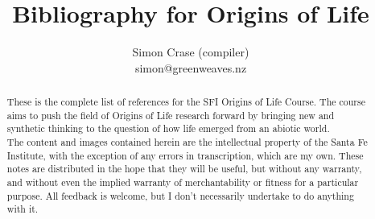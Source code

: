 \documentclass[]{article}
\title{
	Bibliography for Origins of Life
}
\author{Simon Crase (compiler)\\simon@greenweaves.nz}
\begin{document}
\maketitle

\begin{abstract}
	These is the complete list of references for the SFI Origins of Life Course. The course aims to push the field of Origins of Life research forward by bringing new and synthetic thinking to the question of how life emerged from an abiotic world.\\
	The content and images contained herein are the intellectual property of the Santa Fe Institute, with the exception of any errors in transcription, which are my own.
	These notes are distributed in the hope that they will be useful,
	but without any warranty, and without even the implied warranty of
	merchantability or fitness for a particular purpose. All feedback is welcome,
	but I don't necessarily undertake to do anything with it.
\end{abstract}

\nocite{*}


\end{document}
